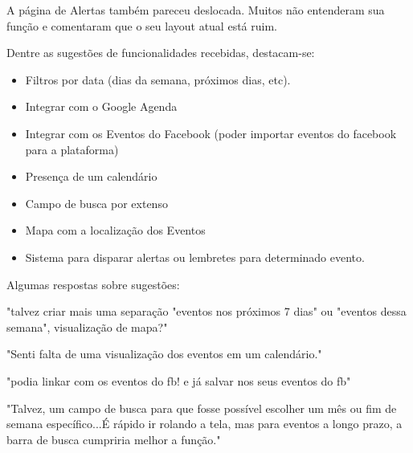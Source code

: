 \par A página de Alertas também pareceu deslocada. Muitos não entenderam sua função e comentaram que o seu layout atual está ruim.
\par Dentre as sugestões de funcionalidades recebidas, destacam-se:
\begin{itemize}
\item Filtros por data (dias da semana, próximos dias, etc).
\item Integrar com o Google Agenda
\item Integrar com os Eventos do Facebook (poder importar eventos do facebook para a plataforma)
\item Presença de um calendário
\item Campo de busca por extenso
\item Mapa com a localização dos Eventos
\item Sistema para disparar alertas ou lembretes para determinado evento.
\end{itemize}

\par Algumas respostas sobre sugestões:
\par "talvez criar mais uma separação "eventos nos próximos 7 dias" ou "eventos dessa semana", visualização de mapa?"
\par "Senti falta de uma visualização dos eventos em um calendário."
\par "podia linkar com os eventos do fb! e já salvar nos seus eventos do fb"
\par "Talvez, um campo de busca para que fosse possível escolher um mês ou fim de semana específico...É rápido ir rolando a tela, mas para eventos a longo prazo, a barra de busca cumpriria melhor a função."

